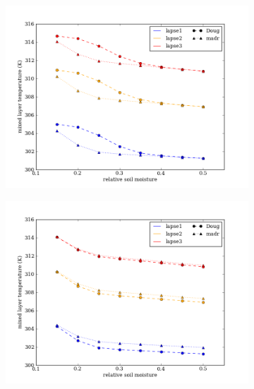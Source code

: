 \begin{figure}[here]
\begin{subfigure}{0.5\textwidth}
\includegraphics[width=\textwidth]{ch2-BL/figures/theta_afternoon_T.png}
\caption{}
\end{subfigure}
\begin{subfigure}{0.5\textwidth}
\includegraphics[width=\textwidth]{ch2-BL/figures/VPD_afternoon_T.png}
\caption{}
\end{subfigure}
\caption{}
\label{fig:BL_testVPDtheta}
\end{figure}

